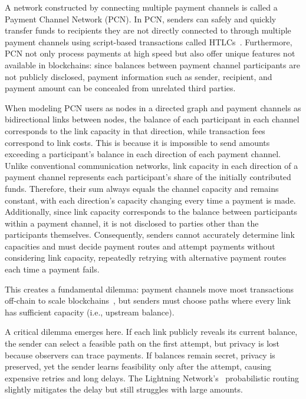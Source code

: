 \documentclass[conference]{IEEEtran}
\begin{document}
A network constructed by connecting multiple payment channels is called a Payment Channel Network (PCN).
In PCN, senders can safely and quickly transfer funds to recipients they are not directly connected to through multiple payment channels using script-based transactions called HTLCs~\cite{poon_dryja_2016}.
Furthermore, PCN not only process payments at high speed but also offer unique features not available in blockchains: since balances between payment channel participants are not publicly disclosed, payment information such as sender, recipient, and payment amount can be concealed from unrelated third parties.

When modeling PCN users as nodes in a directed graph and payment channels as bidirectional links between nodes, the balance of each participant in each channel corresponds to the link capacity in that direction, while transaction fees correspond to link costs. This is because it is impossible to send amounts exceeding a participant's balance in each direction of each payment channel.
Unlike conventional communication networks, link capacity in each direction of a payment channel represents each participant's share of the initially contributed funds. Therefore, their sum always equals the channel capacity and remains constant, with each direction's capacity changing every time a payment is made.
Additionally, since link capacity corresponds to the balance between participants within a payment channel, it is not disclosed to parties other than the participants themselves.
Consequently, senders cannot accurately determine link capacities and must decide payment routes and attempt payments without considering link capacity, repeatedly retrying with alternative payment routes each time a payment fails.

This creates a fundamental dilemma: payment channels move most transactions off-chain to scale blockchains~\cite{poon_dryja_2016}, but senders must choose paths where every link has sufficient capacity (i.e., upstream balance).

A critical dilemma emerges here.
If each link publicly reveals its current balance, the sender can select a feasible path on the first attempt, but privacy is lost because observers can trace payments.
If balances remain secret, privacy is preserved, yet the sender learns feasibility only after the attempt, causing expensive retries and long delays.
The Lightning Network's~\cite{lnbolt} probabilistic routing slightly mitigates the delay but still struggles with large amounts.
\end{document}
